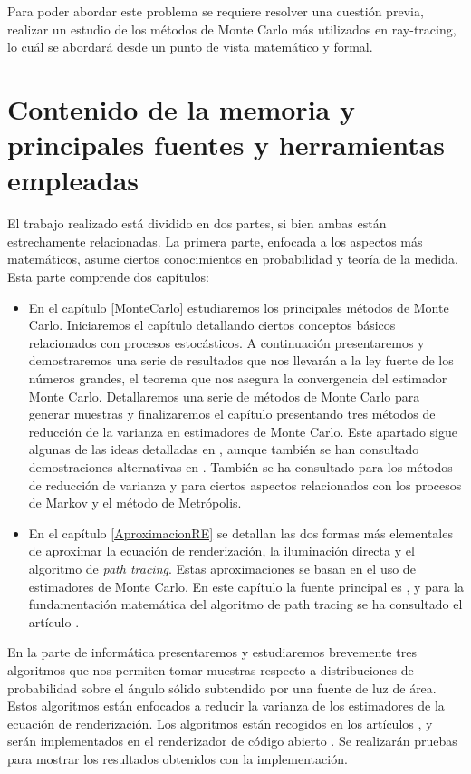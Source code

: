 Para poder abordar este problema se requiere resolver una cuestión previa, realizar un estudio de los métodos de Monte Carlo más utilizados en ray-tracing, lo cuál se abordará desde un punto de vista matemático y formal.

\section{Contenido de la memoria y principales fuentes y herramientas empleadas}
El trabajo realizado está dividido en dos partes, si bien ambas están estrechamente relacionadas. La primera parte, enfocada a los aspectos más matemáticos, asume ciertos conocimientos en probabilidad y teoría de la medida. Esta parte comprende dos capítulos:
\begin{itemize}
\item En el capítulo \ref{MonteCarlo} estudiaremos los principales métodos de Monte Carlo. Iniciaremos el capítulo detallando ciertos conceptos básicos relacionados con procesos estocásticos. A continuación presentaremos y demostraremos una serie de resultados que nos llevarán a la ley fuerte de los números grandes, el teorema que nos asegura la convergencia del estimador Monte Carlo. Detallaremos una serie de métodos de Monte Carlo para generar muestras y finalizaremos el capítulo presentando tres métodos de reducción de la varianza en estimadores de Monte Carlo. Este apartado sigue algunas de las ideas detalladas en \cite{Graham2013}, aunque también se han consultado demostraciones alternativas en \cite{Williams1991}. También se ha consultado \cite{Veach97} para los métodos de reducción de varianza y \cite{Roberts2004} para ciertos aspectos relacionados con los procesos de Markov y el método de Metrópolis.

\item En el capítulo \ref{AproximacionRE} se detallan las dos formas más elementales de aproximar la ecuación de renderización, la iluminación directa y el algoritmo de \emph{path tracing}. Estas aproximaciones se basan en el uso de estimadores de Monte Carlo. En este capítulo la fuente principal es \cite{Pharr2016}, y para la fundamentación matemática del algoritmo de path tracing se ha consultado el artículo \cite{Dimov2005}. 
\end{itemize}

En la parte de informática presentaremos y estudiaremos brevemente tres algoritmos que nos permiten tomar muestras respecto a distribuciones de probabilidad sobre el ángulo sólido subtendido por una fuente de luz de área. Estos algoritmos están enfocados a reducir la varianza de los estimadores de la ecuación de renderización. Los algoritmos están recogidos en los artículos \cite{Urena2013} \cite{Urena2018} \cite{Guillen2017}, y serán implementados en el renderizador de código abierto \cite{pbrtCode}. Se realizarán pruebas para mostrar los resultados obtenidos con la implementación.

